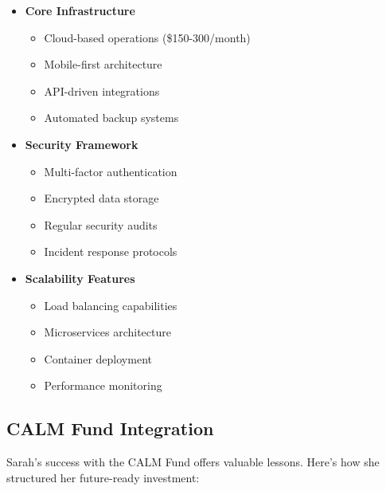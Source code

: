 \begin{itemize}
    \item \textbf{Core Infrastructure}
    \begin{itemize}
        \item Cloud-based operations (\$150-300/month)
        \item Mobile-first architecture
        \item API-driven integrations
        \item Automated backup systems
    \end{itemize}

    \item \textbf{Security Framework}
    \begin{itemize}
        \item Multi-factor authentication
        \item Encrypted data storage
        \item Regular security audits
        \item Incident response protocols
    \end{itemize}

    \item \textbf{Scalability Features}
    \begin{itemize}
        \item Load balancing capabilities
        \item Microservices architecture
        \item Container deployment
        \item Performance monitoring
    \end{itemize}
\end{itemize}

\subsection{CALM Fund Integration}\label{subsec:calm-integration}

Sarah's success with the CALM Fund offers valuable lessons. Here's how she structured her future-ready investment:


